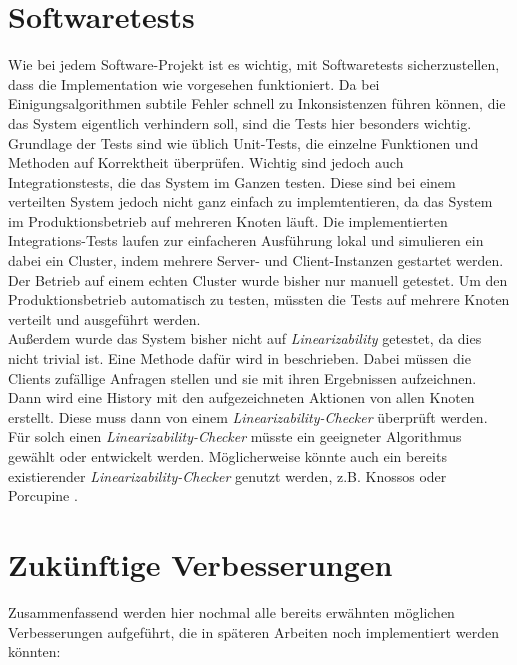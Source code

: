 \section{Softwaretests}

Wie bei jedem Software-Projekt ist es wichtig, mit Softwaretests sicherzustellen, dass die Implementation wie vorgesehen funktioniert. Da bei Einigungsalgorithmen subtile Fehler schnell zu Inkonsistenzen führen können, die das System eigentlich verhindern soll, sind die Tests hier besonders wichtig. Grundlage der Tests sind wie üblich Unit-Tests, die einzelne Funktionen und Methoden auf Korrektheit überprüfen. Wichtig sind jedoch auch Integrationstests, die das System im Ganzen testen. Diese sind bei einem verteilten System jedoch nicht ganz einfach zu implemtentieren, da das System im Produktionsbetrieb auf mehreren Knoten läuft. Die implementierten Integrations-Tests laufen zur einfacheren Ausführung lokal und simulieren ein dabei ein Cluster, indem mehrere Server- und Client-Instanzen gestartet werden. Der Betrieb auf einem echten Cluster wurde bisher nur manuell getestet. Um den Produktionsbetrieb automatisch zu testen, müssten die Tests auf mehrere Knoten verteilt und ausgeführt werden. \\
Außerdem wurde das System bisher nicht auf \textit{Linearizability} getestet, da dies nicht trivial ist. Eine Methode dafür wird in \cite{testing} beschrieben. Dabei müssen die Clients zufällige Anfragen stellen und sie mit ihren Ergebnissen aufzeichnen. Dann wird eine History mit den aufgezeichneten Aktionen von allen Knoten erstellt. Diese muss dann von einem \textit{Linearizability-Checker} überprüft werden. Für solch einen \textit{Linearizability-Checker} müsste ein geeigneter Algorithmus gewählt oder entwickelt werden. Möglicherweise könnte auch ein bereits existierender \textit{Linearizability-Checker} genutzt werden, z.B. Knossos \cite{knossos} oder Porcupine \cite{porcupine}.\\


\section{Zukünftige Verbesserungen}

Zusammenfassend werden hier nochmal alle bereits erwähnten möglichen Verbesserungen aufgeführt, die in späteren Arbeiten noch implementiert werden könnten:

